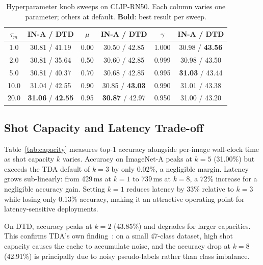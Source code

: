 \documentclass[10pt,twocolumn,letterpaper]{article}
\newcommand{\best}[1]{\textbf{#1}}
\begin{document}
\begin{table}[t]
\centering\small\setlength{\tabcolsep}{2.8pt}
\caption{Hyperparameter knob sweeps on CLIP-RN50.
  Each column varies one parameter; others at default.
  \textbf{Bold}: best result per sweep.}
\label{tab:knobs}
\begin{tabular}{cc|cc|cc}
\toprule
$\tau_m$ & IN-A / DTD &
$\mu$    & IN-A / DTD &
$\gamma$ & IN-A / DTD \\
\midrule
1.0  & 30.81 / 41.19
     & 0.00  & 30.50 / 42.85
     & 1.000 & 30.98 / \best{43.56} \\
2.0  & 30.81 / 35.64
     & 0.50  & 30.60 / 42.85
     & 0.999 & 30.98 / 43.50 \\
5.0  & 30.81 / 40.37
     & 0.70  & 30.68 / 42.85
     & 0.995 & \best{31.03} / 43.44 \\
10.0 & 31.04 / 42.55
     & 0.90  & 30.85 / \best{43.03}
     & 0.990 & 31.01 / 43.38 \\
20.0 & \best{31.06} / \best{42.55}
     & 0.95  & \best{30.87} / 42.97
     & 0.950 & 31.00 / 43.20 \\
\bottomrule
\end{tabular}
\end{table}

\subsection{Shot Capacity and Latency Trade-off}
\label{subsec:capacity}

Table~\ref{tab:capacity} measures top-1 accuracy alongside
per-image wall-clock time as shot capacity $k$ varies.
Accuracy on ImageNet-A peaks at $k{=}5$ (31.00\%) but exceeds the
TDA default of $k{=}3$ by only 0.02\%, a negligible margin.
Latency grows sub-linearly: from 429\,ms at $k{=}1$ to 739\,ms
at $k{=}8$, a 72\% increase for a negligible accuracy gain.
Setting $k{=}1$ reduces latency by 33\% relative to $k{=}3$ while
losing only 0.13\% accuracy, making it an attractive operating point
for latency-sensitive deployments.

On DTD, accuracy peaks at $k{=}2$ (43.85\%) and degrades for
larger capacities.
This confirms TDA's own finding~\cite{karmanov2024tda}: on a small
47-class dataset, high shot capacity causes the cache to accumulate
noise, and the accuracy drop at $k{=}8$ (42.91\%) is principally
due to noisy pseudo-labels rather than class imbalance.
\end{document}
